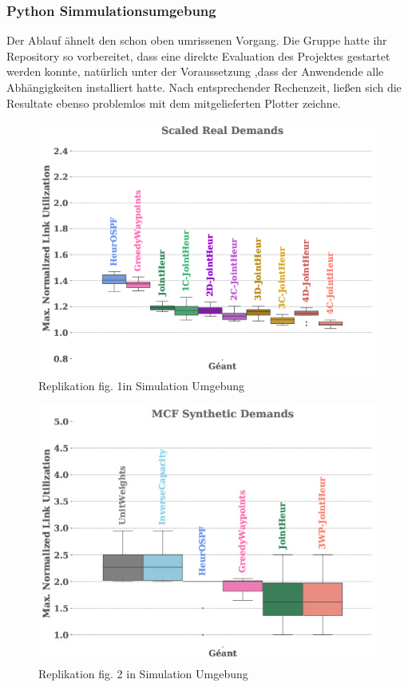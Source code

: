 \documentclass[sigconf,noacm,review]{acmart}
\begin{document}
\subsubsection{Python Simmulationsumgebung}
Der Ablauf ähnelt den schon oben umrissenen Vorgang. Die Gruppe hatte ihr Repository so vorbereitet, dass eine direkte Evaluation des Projektes gestartet werden konnte, natürlich unter der Voraussetzung ,dass der Anwendende alle Abhängigkeiten installiert hatte. Nach entsprechender Rechenzeit, ließen sich die Resultate ebenso problemlos mit dem mitgelieferten Plotter zeichne.
\begin{figure}
  \centering
  \caption{Replikation fig. 1in Simulation Umgebung}
  \label{fig:g00r}
  \includegraphics[width=\linewidth]{assets/g1rep0.png}
\end{figure}
\begin{figure}
  \centering
  \caption{Replikation fig. 2 in Simulation Umgebung}
  \label{fig:g01r}
  \includegraphics[width=\linewidth]{assets/g1rep1.jpg}
\end{figure}
\end{document}
